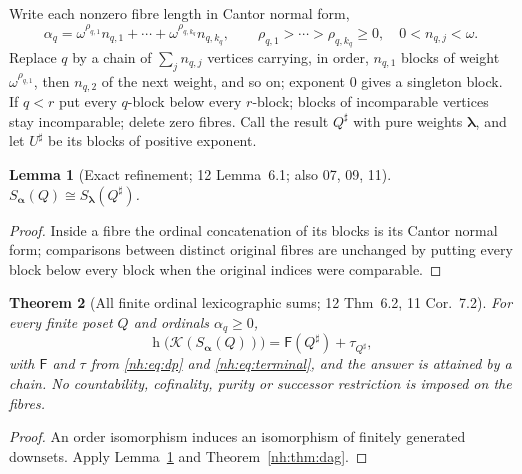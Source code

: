 \documentclass[11pt,a4paper]{article}
\newtheorem{theorem}{Theorem}[section]
\newtheorem{lemma}[theorem]{Lemma}
\theoremstyle{definition}
\theoremstyle{remark}
\newcommand{\K}{\mathcal K}
\newcommand{\hgt}{\operatorname{h}}
\newcommand{\Fdp}{\mathsf F}
\begin{document}
Write each nonzero fibre length in Cantor normal form,
\begin{equation}\label{nh:eq:cnf}
 \alpha_q=\omega^{\rho_{q,1}}n_{q,1}+\cdots+\omega^{\rho_{q,k_q}}n_{q,k_q},
 \qquad \rho_{q,1}>\cdots>\rho_{q,k_q}\ge0,\quad 0<n_{q,j}<\omega .
\end{equation}
Replace $q$ by a chain of $\sum_jn_{q,j}$ vertices carrying, in order,
$n_{q,1}$ blocks of weight $\omega^{\rho_{q,1}}$, then $n_{q,2}$ of the next
weight, and so on; exponent $0$ gives a singleton block. If $q<r$ put every
$q$-block below every $r$-block; blocks of incomparable vertices stay
incomparable; delete zero fibres. Call the result $Q^\sharp$ with pure weights
$\boldsymbol\lambda$, and let $U^\sharp$ be its blocks of positive exponent.

\begin{lemma}[Exact refinement; 12 Lemma~6.1; also 07, 09, 11]\label{nh:lem:refine}
$S_{\boldsymbol\alpha}(Q)\cong S_{\boldsymbol\lambda}(Q^\sharp)$.
\end{lemma}
\begin{proof}
Inside a fibre the ordinal concatenation of its blocks is its Cantor normal
form; comparisons between distinct original fibres are unchanged by putting
every block below every block when the original indices were comparable.
\end{proof}

\begin{theorem}[All finite ordinal lexicographic sums; 12 Thm~6.2, 11 Cor.~7.2]
\label{nh:thm:arbitrary}
For every finite poset $Q$ and ordinals $\alpha_q\ge0$,
\[
 \boxed{\hgt\bigl(\K(S_{\boldsymbol\alpha}(Q))\bigr)=\Fdp(Q^\sharp)+\tau_{Q^\sharp},}
\]
with $\Fdp$ and $\tau$ from \eqref{nh:eq:dp} and \eqref{nh:eq:terminal}, and the
answer is attained by a chain. No countability, cofinality, purity or successor
restriction is imposed on the fibres.
\end{theorem}
\begin{proof}
An order isomorphism induces an isomorphism of finitely generated downsets.
Apply Lemma~\ref{nh:lem:refine} and Theorem~\ref{nh:thm:dag}.
\end{proof}
\end{document}
